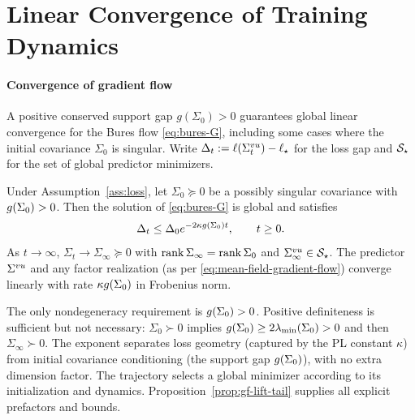 \section{Linear Convergence of Training Dynamics}
\vspace{-0.5em}
\label{sec:convergence}\label{sec:balanced-convergence}
\label{sec:sampling}\label{sec:finite-width}

\paragraph{Convergence of gradient flow}
A positive conserved support gap $g(\Sigma_0) > 0$ guarantees global linear convergence for the Bures flow \eqref{eq:bures-G}, including some cases where the initial covariance $\Sigma_0$ is singular. Write $\Delta_t:=\ell(\Sigma^{vu}_t)-\ell_\star$ for the loss gap and $\mathcal S_\star$ for the set of global predictor minimizers.

\begin{theorem}\label{thm:gf}\label{thm:balanced-convergence}
Under Assumption~\ref{ass:loss}, let $\Sigma_0\succeq0$ be a possibly
singular covariance with $g(\Sigma_0)>0$.
Then the solution of \eqref{eq:bures-G} is global and satisfies
\begin{equation}\label{eq:gf-rate}
 \Delta_t\le\Delta_0e^{-2\kappa g(\Sigma_0)t},\qquad t\ge0.
\end{equation}
As $t \to \infty$, $\Sigma_t \to \Sigma_\infty\succeq0$ with
$\operatorname{rank}\Sigma_\infty=\operatorname{rank}\Sigma_0$ and $\Sigma^{vu}_\infty\in\mathcal S_\star$.
The predictor $\Sigma^{vu}$ and any factor realization (as per \eqref{eq:mean-field-gradient-flow}) converge linearly with rate $\kappa g(\Sigma_0)$ in Frobenius norm.
\end{theorem}

The only nondegeneracy requirement is $g(\Sigma_0)>0$.
Positive definiteness is sufficient but not necessary: $\Sigma_0\succ0$ implies $g(\Sigma_0)\ge2\lambda_{\min}(\Sigma_0)>0$ and then
$\Sigma_\infty\succ0$. The exponent separates loss geometry (captured by the PL constant $\kappa$)
from initial covariance conditioning (the support gap $g(\Sigma_0)$), with no extra
dimension factor. The trajectory selects a global minimizer according to its initialization and dynamics. Proposition~\ref{prop:gf-lift-tail} supplies all explicit prefactors and bounds.


